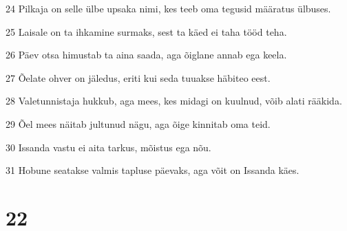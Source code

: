 \par 24 Pilkaja on selle ülbe upsaka nimi, kes teeb oma tegusid määratus ülbuses.
\par 25 Laisale on ta ihkamine surmaks, sest ta käed ei taha tööd teha.
\par 26 Päev otsa himustab ta aina saada, aga õiglane annab ega keela.
\par 27 Õelate ohver on jäledus, eriti kui seda tuuakse häbiteo eest.
\par 28 Valetunnistaja hukkub, aga mees, kes midagi on kuulnud, võib alati rääkida.
\par 29 Õel mees näitab jultunud nägu, aga õige kinnitab oma teid.
\par 30 Issanda vastu ei aita tarkus, mõistus ega nõu.
\par 31 Hobune seatakse valmis tapluse päevaks, aga võit on Issanda käes.

\chapter{22}

